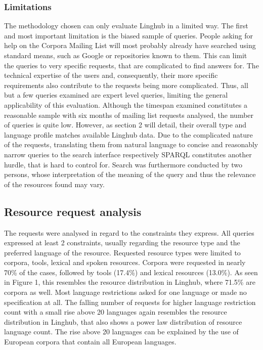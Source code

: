 \documentclass[smallextended]{svjour3}       %
\begin{document}
\subsubsection{Limitations}

The methodology chosen can only evaluate Linghub in a limited way. The first and
most important limitation is the biased sample of queries. People asking for
help on the Corpora Mailing List will most probably already have searched using
standard means, such as Google or repositories known to them. This can limit the
queries to very specific requests, that are complicated to find answers for. The
technical expertise of the users and, consequently, their more specific
requirements also contribute to the requests being more complicated. Thus, all
but a few queries examined are expert level queries, limiting the general
applicability of this evaluation. 
Although the timespan examined constitutes a reasonable sample with six months
of mailing list requests analysed, the number of queries is quite low. However,
as section 2 will detail, their overall type and language profile matches
available Linghub data.
Due to the complicated nature of the requests, translating them from natural
language to concise and reasonably narrow queries to the search interface
respectively SPARQL constitutes another hurdle, that is hard to control for. 
Search was furthermore conducted by two persons, whose interpretation of the
meaning of the query and thus the relevance of the resources found may vary. 

\subsection{Resource request analysis}

The requests were analysed in regard to the constraints they express. All
queries expressed at least 2 constraints, usually regarding the resource type
and the preferred language of the resource. Requested resource types were
limited to corpora, tools, lexical and spoken resources. Corpora were requested
in nearly 70\% of the cases, followed by tools (17.4\%) and lexical resources
(13.0\%). As seen in Figure 1, this resembles the resource distribution in
Linghub, where 71.5\% are corpora as well. 
Most language restrictions asked for one language or made no specification at
all. The falling number of requests for higher language restriction count with a
small rise above 20 languages again resembles the resource distribution in
Linghub, that also shows a power law distribution of resource language count.
The rise above 20 languages can be explained by the use of European corpora that
contain all European languages.  
\end{document}
